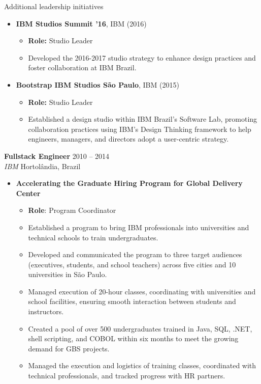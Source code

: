 \documentclass{resume} %
\begin{document}
\begin{rSection}{Additional leadership initiatives}
\begin{itemize}
    \item \textbf{IBM Studios Summit ’16}, \hfill IBM (2016) 
    \begin{itemize}
        \item \textbf{Role:} Studio Leader
        \item Developed the 2016-2017 studio strategy to enhance design practices and foster collaboration at IBM Brazil.
    \end{itemize}
    
    \item \textbf{Bootstrap IBM Studios São Paulo}, \hfill IBM (2015) 
    \begin{itemize}
        \item \textbf{Role:} Studio Leader
        \item Established a design studio within IBM Brazil’s Software Lab, promoting collaboration practices using IBM's Design Thinking framework to help engineers, managers, and directors adopt a user-centric strategy.
    \end{itemize}
\end{itemize}


\hfill \break
\textbf{Fullstack Engineer} \hfill 2010 -- 2014\\
\textit{IBM} \hfill Hortolândia, Brazil\\
\begin{itemize}
    \item \textbf{Accelerating the Graduate Hiring Program for Global Delivery Center}
    \begin{itemize}
        \item \textbf{Role}: Program Coordinator
        \item Established a program to bring IBM professionals into universities and technical schools to train undergraduates.
        \item Developed and communicated the program to three target audiences (executives, students, and school teachers) across five cities and 10 universities in São Paulo.
        \item Managed execution of 20-hour classes, coordinating with universities and school facilities, ensuring smooth interaction between students and instructors.
        \item Created a pool of over 500 undergraduates trained in Java, SQL, .NET, shell scripting, and COBOL within six months to meet the growing demand for GBS projects.
        \item Managed the execution and logistics of training classes, coordinated with technical professionals, and tracked progress with HR partners.
    \end{itemize}
\end{itemize}


\end{rSection}
\end{document}
